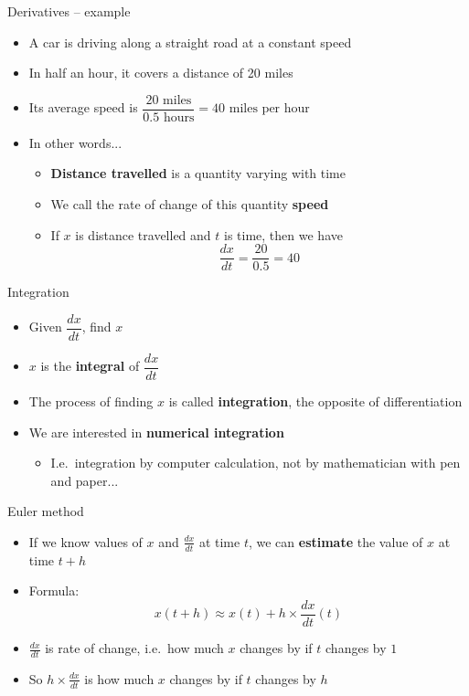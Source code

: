 \begin{frame}{Derivatives -- example}
	\begin{itemize}
		\pause\item A car is driving along a straight road at a constant speed
		\pause\item In half an hour, it covers a distance of 20 miles
		\pause\item Its average speed is $\dfrac{20 \text{ miles}}{0.5 \text{ hours}} = 40 \text{ miles per hour}$
		\pause\item In other words...
			\begin{itemize}
				\pause\item \textbf{Distance travelled} is a quantity varying with time
				\pause\item We call the rate of change of this quantity \textbf{speed}
				\pause\item If $x$ is distance travelled and $t$ is time, then we have
					$$\dfrac{dx}{dt} = \dfrac{20}{0.5} = 40$$
			\end{itemize}
	\end{itemize}
\end{frame}

\begin{frame}{Integration}
	\begin{itemize}
		\pause\item Given $\dfrac{dx}{dt}$, find $x$
		\pause\item $x$ is the \textbf{integral} of $\dfrac{dx}{dt}$
		\pause\item The process of finding $x$ is called \textbf{integration}, the opposite of differentiation
		\pause\item We are interested in \textbf{numerical integration}
			\begin{itemize}
				\pause\item I.e.\ integration by computer calculation, not by mathematician with pen and paper...
			\end{itemize}
	\end{itemize}
\end{frame}

\begin{frame}{Euler method}
	\begin{itemize}
		\pause\item If we know values of $x$ and $\frac{dx}{dt}$ at time $t$, we can \textbf{estimate}
			the value of $x$ at time $t+h$
		\pause\item Formula:
			$$ x(t+h) \approx x(t) + h \times \frac{dx}{dt}(t) $$
		\pause\item $\frac{dx}{dt}$ is rate of change, i.e.\ how much $x$ changes by if $t$ changes by $1$
		\pause\item So $h \times \frac{dx}{dt}$ is how much $x$ changes by if $t$ changes by $h$
	\end{itemize}
\end{frame}

